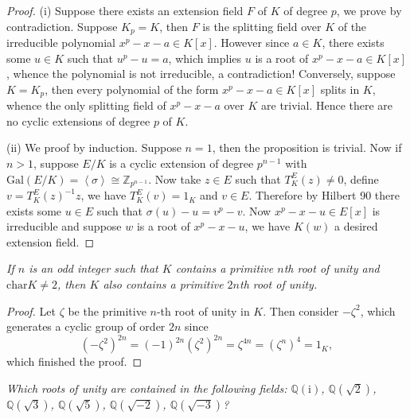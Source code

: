 \begin{proof}
(i) Suppose there exists an extension field $F$ of $K$ of degree $p$, we prove by contradiction. Suppose $K_p=K$, then $F$ is the splitting field over $K$ of the irreducible polynomial $x^p-x-a\in K[x]$. However since $a\in K$, there exists some $u\in K$ such that $u^p-u=a$, which implies $u$ is a root of $x^p-x-a\in K[x]$, whence the polynomial is not irreducible, a contradiction! Conversely, suppose $K=K_p$, then every polynomial of the form $x^p-x-a\in K[x]$ splits in $K$, whence the only splitting field of $x^p-x-a$ over $K$ are trivial. Hence there are no cyclic extensions of degree $p$ of $K$.\par
(ii) We proof by induction. Suppose $n=1$, then the proposition is trivial. Now if $n>1$, suppose $E/K$ is a cyclic extension of degree $p^{n-1}$ with $\mathrm{Gal}(E/K)=\left<\sigma\right>\cong\mathbb{Z}_{p^{n-1}}$. Now take $z\in E$ such that $T_K^E(z)\ne 0$, define $v=T_K^E(z)^{-1}z$, we have $T_K^E(v)=1_K$ and $v\in E$. Therefore by Hilbert 90 there exists some $u\in E$ such that $\sigma(u)-u=v^p-v$. Now $x^p-x-u\in E[x]$ is irreducible and suppose $w$ is a root of $x^p-x-u$, we have $K(w)$ a desired extension field.
\end{proof}
\begin{problem}\em
If $n$ is an odd integer such that $K$ contains a primitive $n$th root of unity and $\mathrm{char}K\neq 2$, then $K$ also contains a primitive $2n$th root of unity.
\end{problem}
\begin{proof}
Let $\zeta$ be the primitive $n$-th root of unity in $K$. Then consider $-\zeta^2$, which generates a cyclic group of order $2n$ since 
$$
\left( -\zeta ^2 \right) ^{2n}=\left( -1 \right) ^{2n}\left( \zeta ^2 \right) ^{2n}=\zeta ^{4n}=\left( \zeta ^n \right) ^4=1_K,
$$
which finished the proof.
\end{proof}
\begin{problem}\em
Which roots of unity are contained in the following fields: $\mathbb{Q}(\mathrm{i})$, $\mathbb{Q}(\sqrt{2})$, $\mathbb{Q}(\sqrt{3})$, $\mathbb{Q}(\sqrt{5})$, $\mathbb{Q}(\sqrt{-2})$, $\mathbb{Q}(\sqrt{-3})$?
\end{problem}
